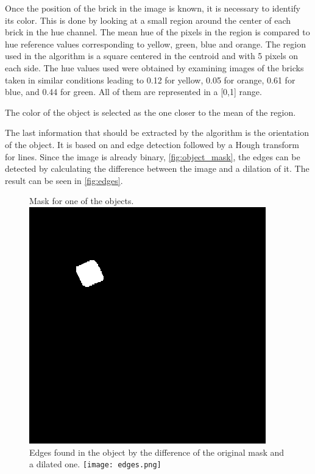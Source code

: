 Once the position of the brick in the image is known, it is necessary to identify its color. This is done by looking at a small region around the center of each brick in the hue channel. The mean hue of the pixels in the region is compared to hue reference values corresponding to yellow, green, blue and orange. The region used in the algorithm is a square centered in the centroid and with 5 pixels on each side. The hue values used were obtained by examining images of the bricks taken in similar conditions leading to 0.12 for yellow, 0.05 for orange, 0.61 for blue, and 0.44 for green. All of them are represented in a [0,1] range.

The color of the object is selected as the one closer to the mean of the region.

The last information that should be extracted by the algorithm is the orientation of the object. It is based on and edge detection followed by a Hough transform for lines. Since the image is already binary, \autoref{fig:object_mask}, the edges can be detected by calculating the difference between the image and a dilation of it. The result can be seen in \autoref{fig:edges}.

\begin{figure}[H]
	\captionbox  %
	{
		Mask for one of the objects.              
		\label{fig:object_mask}                                  
	}                                                                 
	{                                                                  
		\includegraphics[width=.25\textwidth]{figures/object_mask.png}         
	}                                                                    
	\hspace{5pt}                                                          
	\captionbox
	{       
		Edges found in the object by the difference of the original mask and a dilated one.
		\label{fig:edges}                                     
	}
	{
		\texttt{[image: edges.png]}            
	}                                                                              
\end{figure}

